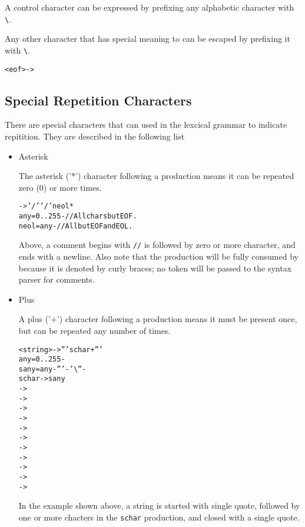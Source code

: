 A control character can be expressed by prefixing any alphabetic
character with \texttt{\textbackslash}.

Any other character that has special meaning to \dfae can be escaped
by prefixing it with \texttt{\textbackslash}.

\begin{alltt}
  <eof>  -> 
\end{alltt}

\subsection{Special Repetition Characters}
There are special characters that can used in the lexcical grammar
to indicate repitition.  They are described in the following list

\begin{itemize}
\item Asterisk

  The asterisk ('*') character following a production means it can be
  repeated zero (0) or more times.

  \begin{alltt}
     -> '/' '/' neol*
    any           = 0..255 -    // All chars but EOF.
    neol          = any -       // All but EOF and EOL.
  \end{alltt}

  Above, a comment begins with \texttt{//} is followed by zero or more
  character, and ends with a newline.  Also note that the
  \texttt{} production will be fully consumed
  by \dfae because it is denoted by curly braces; no token will be
  passed to the syntax parser for comments.

\item Plus

  A plus ('+') character following a production means it must be
  present once, but can be repeated any number of times.

  \begin{alltt}
    <string>  -> ''' schar+ '''
    any       = 0..255 - 
    sany      = any - ''' - '\textbackslash'' - 
    schar     -> sany
              -> \escape{\textbackslash}
              -> 
              -> 
              -> 
              -> 
              -> 
              -> 
              -> 
              -> 
              -> 
              -> 
  \end{alltt}

  In the example shown above, a string is started with single quote,
  followed by one or more chacters in the \texttt{schar} production,
  and closed with a single quote.
\end{itemize}


